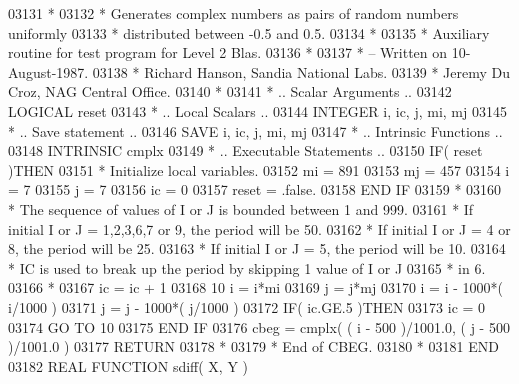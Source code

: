 \begin{DoxyCode}
03131 \textcolor{comment}{*}
03132 \textcolor{comment}{*  Generates complex numbers as pairs of random numbers uniformly}
03133 \textcolor{comment}{*  distributed between -0.5 and 0.5.}
03134 \textcolor{comment}{*}
03135 \textcolor{comment}{*  Auxiliary routine for test program for Level 2 Blas.}
03136 \textcolor{comment}{*}
03137 \textcolor{comment}{*  -- Written on 10-August-1987.}
03138 \textcolor{comment}{*     Richard Hanson, Sandia National Labs.}
03139 \textcolor{comment}{*     Jeremy Du Croz, NAG Central Office.}
03140 \textcolor{comment}{*}
03141 \textcolor{comment}{*     .. Scalar Arguments ..}
03142       \textcolor{keywordtype}{LOGICAL}            reset
03143 \textcolor{comment}{*     .. Local Scalars ..}
03144       \textcolor{keywordtype}{INTEGER}            i, ic, j, mi, mj
03145 \textcolor{comment}{*     .. Save statement ..}
03146       \textcolor{keywordtype}{SAVE}               i, ic, j, mi, mj
03147 \textcolor{comment}{*     .. Intrinsic Functions ..}
03148       \textcolor{keywordtype}{INTRINSIC}          cmplx
03149 \textcolor{comment}{*     .. Executable Statements ..}
03150       \textcolor{keywordflow}{IF}( reset )\textcolor{keywordflow}{THEN}
03151 \textcolor{comment}{*        Initialize local variables.}
03152          mi = 891
03153          mj = 457
03154          i = 7
03155          j = 7
03156          ic = 0
03157          reset = .false.
03158 \textcolor{keywordflow}{      END IF}
03159 \textcolor{comment}{*}
03160 \textcolor{comment}{*     The sequence of values of I or J is bounded between 1 and 999.}
03161 \textcolor{comment}{*     If initial I or J = 1,2,3,6,7 or 9, the period will be 50.}
03162 \textcolor{comment}{*     If initial I or J = 4 or 8, the period will be 25.}
03163 \textcolor{comment}{*     If initial I or J = 5, the period will be 10.}
03164 \textcolor{comment}{*     IC is used to break up the period by skipping 1 value of I or J}
03165 \textcolor{comment}{*     in 6.}
03166 \textcolor{comment}{*}
03167       ic = ic + 1
03168    10 i = i*mi
03169       j = j*mj
03170       i = i - 1000*( i/1000 )
03171       j = j - 1000*( j/1000 )
03172       \textcolor{keywordflow}{IF}( ic.GE.5 )\textcolor{keywordflow}{THEN}
03173          ic = 0
03174          \textcolor{keywordflow}{GO TO} 10
03175 \textcolor{keywordflow}{      END IF}
03176       cbeg = cmplx( ( i - 500 )/1001.0, ( j - 500 )/1001.0 )
03177       \textcolor{keywordflow}{RETURN}
03178 \textcolor{comment}{*}
03179 \textcolor{comment}{*     End of CBEG.}
03180 \textcolor{comment}{*}
03181 \textcolor{keyword}{      END}
03182 \textcolor{keyword}{      REAL }\textcolor{keyword}{FUNCTION }sdiff( X, Y )

\end{DoxyCode}
